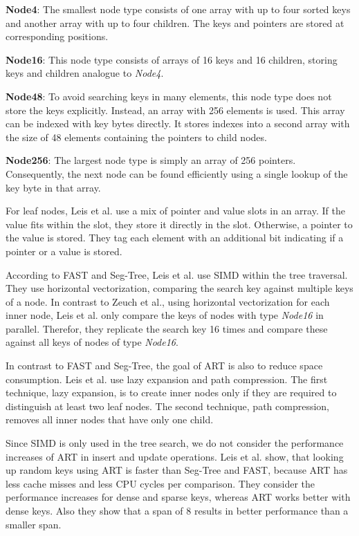 \documentclass[runningheads,a4paper]{llncs}
\begin{document}
\textbf{Node4}: The smallest node type consists of one array with up to four sorted keys and another array with up to four children. The keys and pointers are stored at corresponding positions.

\textbf{Node16}: This node type consists of arrays of 16 keys and 16 children, storing keys and children analogue to \emph{Node4}.

\textbf{Node48}: To avoid searching keys in many elements, this node type does not store the keys explicitly. Instead, an array with 256 elements is used. This array can be indexed with key bytes directly. It stores indexes into a second array with the size of 48 elements containing the pointers to child nodes.

\textbf{Node256}: The largest node type is simply an array of 256 pointers. Consequently, the next node can be found efficiently using a single lookup of the key byte in that array. 

For leaf nodes, Leis et al. use a mix of pointer and value slots in an array. If the value fits within the slot, they store it directly in the slot. Otherwise, a pointer to the value is stored. They tag each element with an additional bit indicating if a pointer or a value is stored.

According to FAST and Seg-Tree, Leis et al. use SIMD within the tree traversal. They use horizontal vectorization, comparing the search key against multiple keys of a node. In contrast to Zeuch et al., using horizontal vectorization for each inner node, Leis et al. only compare the keys of nodes with type \emph{Node16} in parallel. Therefor, they replicate the search key 16 times and compare these against all keys of nodes of type \emph{Node16}.

In contrast to FAST and Seg-Tree, the goal of ART is also to reduce space consumption. Leis et al. use lazy expansion and path compression. The first technique, lazy expansion, is to create inner nodes only if they are required to distinguish at least two leaf nodes. The second technique, path compression, removes all inner nodes that have only one child.

Since SIMD is only used in the tree search, we do not consider the performance increases of ART in insert and update operations. Leis et al. show, that looking up random keys using ART is faster than Seg-Tree and FAST, because ART has less cache misses and less CPU cycles per comparison. They consider the performance increases for dense and sparse keys, whereas ART works better with dense keys. Also they show that a span of 8 results in better performance than a smaller span. 
\end{document}
